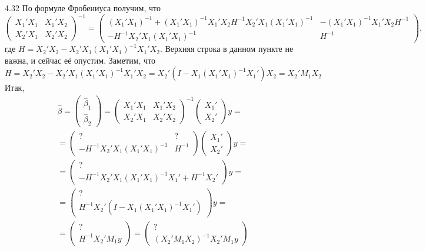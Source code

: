 \begin{solution}{{4.32}}
По формуле Фробениуса получим, что
\[\left(\begin{array}{cc}
X_1'X_1 & X_1'X_2\\
X_2'X_1 & X_2'X_2
\end{array}\right)^{-1}=
\left(\begin{array}{cc}
(X_1'X_1)^{-1}+(X_1'X_1)^{-1}X_1'X_2H^{-1}X_2'X_1(X_1'X_1)^{-1} & -(X_1'X_1)^{-1}X_1'X_2H^{-1}\\
-H^{-1}X_2'X_1(X_1'X_1)^{-1} & H^{-1}
\end{array}\right),\]
где $H=X_2'X_2-X_2'X_1(X_1'X_1)^{-1}X_1'X_2$. Верхняя строка в данном пункте не важна, и сейчас её опустим. Заметим, что
\[H=X_2'X_2-X_2'X_1(X_1'X_1)^{-1}X_1'X_2=X_2'(I-X_1(X_1'X_1)^{-1}X_1')X_2=X_2'M_1X_2\]
Итак,
\begin{multline*}
\hat\beta=\left(\begin{array}{c}
\hat\beta_1\\
\hat\beta_2
\end{array}\right)=
\left(\begin{array}{cc}
X_1'X_1 & X_1'X_2\\
X_2'X_1 & X_2'X_2
\end{array}\right)^{-1}\left(\begin{array}{c}
X_1'\\
X_2'
\end{array}\right)y=\\=\left(\begin{array}{cc}
? & ?\\
-H^{-1}X_2'X_1(X_1'X_1)^{-1} & H^{-1}
\end{array}\right)\left(\begin{array}{c}
X_1'\\
X_2'
\end{array}\right)y=\\=\left(\begin{array}{c}
?\\
-H^{-1}X_2'X_1(X_1'X_1)^{-1}X_1'+H^{-1}X_2'
\end{array}\right)y=\\=
\left(\begin{array}{c}
?\\
H^{-1}X_2'(I-X_1(X_1'X_1)^{-1}X_1')
\end{array}\right)y=\\=
\left(\begin{array}{c}
?\\
H^{-1}X_2'M_1y
\end{array}\right)=
\left(\begin{array}{c}
?\\
(X_2'M_1X_2)^{-1}X_2'M_1y
\end{array}\right)
\end{multline*}


\end{solution}

